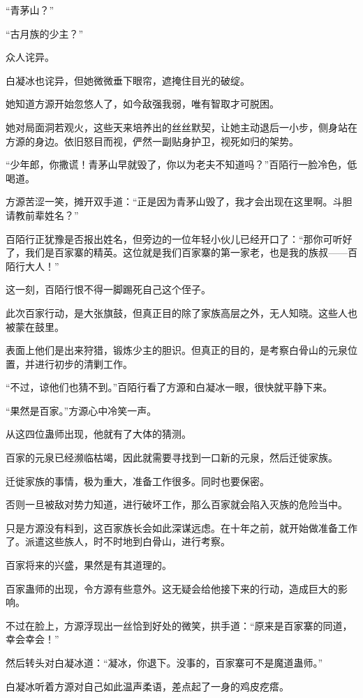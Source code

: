 \begin{this_body}
“青茅山？”

“古月族的少主？”

众人诧异。

白凝冰也诧异，但她微微垂下眼帘，遮掩住目光的破绽。

她知道方源开始忽悠人了，如今敌强我弱，唯有智取才可脱困。

她对局面洞若观火，这些天来培养出的丝丝默契，让她主动退后一小步，侧身站在方源的身边。依旧怒目而视，俨然一副贴身护卫，视死如归的架势。

“少年郎，你撒谎！青茅山早就毁了，你以为老夫不知道吗？”百陌行一脸冷色，低喝道。

方源苦涩一笑，摊开双手道：“正是因为青茅山毁了，我才会出现在这里啊。斗胆请教前辈姓名？”

百陌行正犹豫是否报出姓名，但旁边的一位年轻小伙儿已经开口了：“那你可听好了，我们是百家寨的精英。这位就是我们百家寨的第一家老，也是我的族叔——百陌行大人！”

这一刻，百陌行恨不得一脚踢死自己这个侄子。

此次百家行动，是大张旗鼓，但真正目的除了家族高层之外，无人知晓。这些人也被蒙在鼓里。

表面上他们是出来狩猎，锻炼少主的胆识。但真正的目的，是考察白骨山的元泉位置，并进行初步的清剿工作。

“不过，谅他们也猜不到。”百陌行看了方源和白凝冰一眼，很快就平静下来。

“果然是百家。”方源心中冷笑一声。

从这四位蛊师出现，他就有了大体的猜测。

百家的元泉已经濒临枯竭，因此就需要寻找到一口新的元泉，然后迁徙家族。

迁徙家族的事情，极为重大，准备工作很多。同时也要保密。

否则一旦被敌对势力知道，进行破坏工作，那么百家就会陷入灭族的危险当中。

只是方源没有料到，这百家族长会如此深谋远虑。在十年之前，就开始做准备工作了。派遣这些族人，时不时地到白骨山，进行考察。

百家将来的兴盛，果然是有其道理的。

百家蛊师的出现，令方源有些意外。这无疑会给他接下来的行动，造成巨大的影响。

不过在脸上，方源浮现出一丝恰到好处的微笑，拱手道：“原来是百家寨的同道，幸会幸会！”

然后转头对白凝冰道：“凝冰，你退下。没事的，百家寨可不是魔道蛊师。”

白凝冰听着方源对自己如此温声柔语，差点起了一身的鸡皮疙瘩。


\end{this_body}
